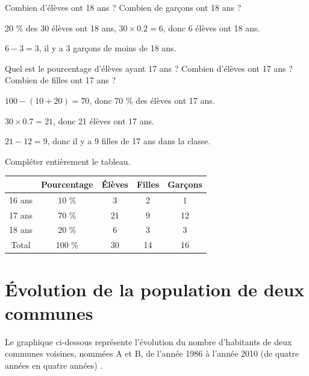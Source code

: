 \documentclass[a4paper,11pt]{exam}
\begin{document}
\begin{questions}
	\question Combien d'élèves ont 18 ans ? Combien de garçons ont 18 ans ?
	\begin{solution}
		20 \%  des 30 élèves ont 18 ans, $30 \times \num{0.2} = 6$, donc 6 élèves ont 18 ans.
		
		$6-3=3$, il y a 3 garçons de moins de 18 ans.
	\end{solution}
	
	\question Quel est le pourcentage d'élèves ayant 17 ans ? Combien d'élèves ont 17 ans ? Combien de filles ont 17 ans ?
	\begin{solution}
		$100 - (10 + 20) = 70$, donc 70 \% des élèves ont 17 ans.
		
		$30 \times \num{0.7} = 21$, donc 21 élèves ont 17 ans.
		
		$21 - 12 = 9$, donc il y a 9 filles de 17 ans dans la classe.
	\end{solution}
	
	\question Compléter entièrement le tableau.
	\begin{solution}
		\begin{center}
			\begin{tabular}{@{\ }c@{\ }|@{\ }c@{\ }|@{\ }c@{\ }|@{\ }c@{\ }|@{\ }c@{\ }|}
				\cline{2-5}
				& Pourcentage & \'Elèves & Filles & Garçons \\ \hline
				\multicolumn{1}{|c|}{16 ans} & \num{10} \% & \num{3} & \num{2}  & \num{1}  \\ \hline
				\multicolumn{1}{|c|}{17 ans} & \num{70} \% & \num{21} & \num{9} & 12 \\ \hline
				\multicolumn{1}{|c|}{18 ans} & \num{20} \%   & 6  & 3 & 3  \\ \hline
				\multicolumn{1}{|c|}{Total}  & \num{100} \% & \num{30}  & 14  & 16\\ \hline
			\end{tabular}	
		\end{center}
	\end{solution}
\end{questions}

\section{\'Evolution de la population de deux communes}
	
	
	Le graphique ci-dessous représente l'évolution du nombre d'habitants de deux communes voisines, nommées A et B, de l'année 1986 à l'année 2010 (de quatre années en quatre années) .
	
\end{document}
